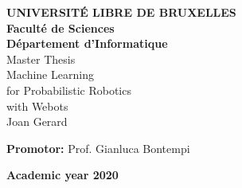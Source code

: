 \begin{titlepage}
    \begin{center}
        
        \normalsize
        \textbf{UNIVERSITÉ LIBRE DE BRUXELLES}\\
        \small
        \textbf{Faculté de Sciences}\\
        \textbf{Département d'Informatique}\\
        
        \vspace{4.0cm}
        \huge
        Master Thesis\\
        \vspace{0.5cm}
        \Huge
        Machine Learning\\
        for Probabilistic Robotics\\
        with Webots\\
        
        \vspace{0.5cm}
        \normalsize
        Joan Gerard
        
        \vspace{7cm}
        \small
        \textbf{Promotor:} Prof. Gianluca Bontempi
        
        \vspace{4cm}
        \footnotesize
         \textbf{Academic year 2020}
        
    \end{center}
\end{titlepage}